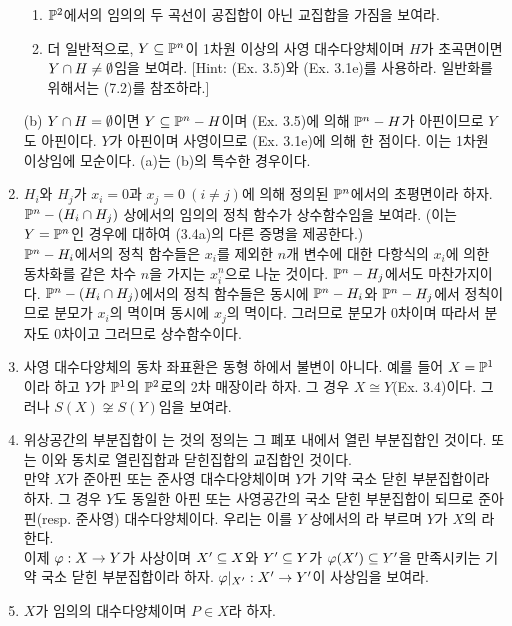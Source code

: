 \begin{enumerate}[label=\tb{3.\arabic*.},itemindent=0mm,itemsep=4mm]
\begin{enumerate}[label=(\alph*)]
		\item $\mathbb{P}^2$에서의 임의의 두 곡선이 공집합이 아닌 교집합을 가짐을 보여라.
		\item 더 일반적으로, $Y\subseteq\mathbb{P}^n$이 1차원 이상의 사영 대수다양체이며 $H$가 초곡면이면 $Y\cap H\ne\emptyset$임을 보여라.
		[Hint: (Ex. 3.5)와 (Ex. 3.1e)를 사용하라. 일반화를 위해서는 (7.2)를 참조하라.]
		\end{enumerate}
		\sol (b) $Y\cap H=\emptyset$이면 $Y\subseteq\mathbb{P}^n-H$이며 (Ex. 3.5)에 의해 $\mathbb{P}^n-H$가 아핀이므로 $Y$도 아핀이다.
		$Y$가 아핀이며 사영이므로 (Ex. 3.1e)에 의해 한 점이다. 이는 1차원 이상임에 모순이다.
		(a)는 (b)의 특수한 경우이다.
		\item $H_i$와 $H_j$가 $x_i=0$과 $x_j=0\:(i\ne j)$에 의해 정의된 $\mathbb{P}^n$에서의 초평면이라 하자.
		$\mathbb{P}^n-(H_i\cap H_j)$ 상에서의 임의의 정칙 함수가 상수함수임을 보여라.
		(이는 $Y=\mathbb{P}^n$인 경우에 대하여 (3.4a)의 다른 증명을 제공한다.)\\
		\sol $\mathbb{P}^n-H_i$에서의 정칙 함수들은 $x_i$를 제외한 $n$개 변수에 대한 다항식의 $x_i$에 의한 동차화를
		같은 차수 $n$을 가지는 $x_i^n$으로 나눈 것이다. $\mathbb{P}^n-H_j$에서도 마찬가지이다.
		$\mathbb{P}^n-(H_i\cap H_j)$에서의 정칙 함수들은 동시에 $\mathbb{P}^n-H_i$와 $\mathbb{P}^n-H_j$에서 정칙이므로
		분모가 $x_i$의 멱이며 동시에 $x_j$의 멱이다. 그러므로 분모가 0차이며 따라서 분자도 0차이고 그러므로 상수함수이다.
		\item 사영 대수다양체의 동차 좌표환은 동형 하에서 불변이 아니다.
		예를 들어 $X=\mathbb{P}^1$이라 하고 $Y$가 $\mathbb{P}^1$의 $\mathbb{P}^2$로의 2차 매장이라 하자.
		그 경우 $X\cong Y$(Ex. 3.4)이다. 그러나 $S(X)\not\cong S(Y)$임을 보여라.\\
		\sol
		\item {} 위상공간의 부분집합이 는 것의 정의는
		그 폐포 내에서 열린 부분집합인 것이다. 또는 이와 동치로 열린집합과 닫힌집합의 교집합인 것이다.\\
		만약 $X$가 준아핀 또는 준사영 대수다양체이며 $Y$가 기약 국소 닫힌 부분집합이라 하자.
		그 경우 $Y$도 동일한 아핀 또는 사영공간의 국소 닫힌 부분집합이 되므로 준아핀(resp. 준사영) 대수다양체이다.
		우리는 이를 $Y$ 상에서의 라 부르며 $Y$가 $X$의 라 한다.\\
		이제 $\varphi:X\rightarrow Y$가 사상이며 $X'\subseteq X$와 $Y'\subseteq Y$가 $\varphi(X')\subseteq Y'$을 만족시키는 기약 국소 닫힌 부분집합이라 하자.
		$\varphi|_{X'}:X'\rightarrow Y'$이 사상임을 보여라.\\
		\sol
		\item $X$가 임의의 대수다양체이며 $P\in X$라 하자.

\end{enumerate}
